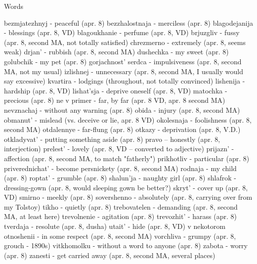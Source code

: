 Words

bezmjatezhnyj - peaceful (apr. 8)
bezzhalostnaja - merciless (apr. 8)
blagodejanija - blessings (apr. 8, VD)
blagoukhanie - perfume (apr. 8, VD)
brjuzgliv - fussy (apr. 8, second MA, not totally satisfied)
chrezmerno - extremely (apr. 8, seems weak)
drjan' - rubbish (apr. 8, second MA)
dushechka - my sweet (apr. 8)
golubchik - my pet (apr. 8)
gorjachnost' serdca - impulsiveness (apr. 8, second MA, not my usual)
izlishnej - unnecessary (apr. 8, second MA, I usually would say excessive)
kvartira - lodgings (throughout, not totally convinced)
lishenija - hardship (apr. 8, VD)
lishat'sja - deprive oneself (apr. 8, VD)
matochka - precious (apr. 8)
ne v primer - far, by far (apr. 8 VD, apr. 8 second MA)
nevznachaj - without any warning (apr. 8)
obida - injury (apr. 8, second MA)
obmanut' - mislead (vs. deceive or lie, apr. 8 VD)
okolesnaja - foolishness (apr. 8, second MA)
otdalennye - far-flung (apr. 8)
otkazy - deprivation (apr. 8, V.D.)
otkladyvat' - putting something aside (apr. 8)
pravo -- honestly (apr. 8, interjection)
prelest' - lovely (apr. 8, VD -- converted to adjective)
prijazn' - affection (apr. 8, second MA, to match "fatherly")
prikhotliv - particular (apr. 8)
priverednichat' - become persnickety (apr. 8, second MA)
rodnaja - my child (apr. 8)
roptat' - grumble (apr. 8)
shalun'ja - naughty girl (apr. 8)
shlafrok - dressing-gown (apr. 8, would sleeping gown be better?)
skryt' - cover up (apr. 8, VD)
smirno - meekly (apr. 8)
sovershenno - absolutely (apr. 8, carrying over from my Tolstoy)
tikho - quietly (apr. 8)
trebovatelen - demanding (apr. 8, second MA, at least here)
trevolnenie - agitation (apr. 8)
trevozhit' - harass (apr. 8)
tverdaja - resolute (apr. 8, dusha)
utait' - hide (apr. 8, VD)
v nekotorom otnoshenii - in some respect (apr. 8, second MA)
vorchliva - grumpy (apr. 8, grouch - 1890s)
vitkhomolku - without a word to anyone (apr. 8)
zabota - worry (apr. 8)
zanesti - get carried away (apr. 8, second MA, several places)